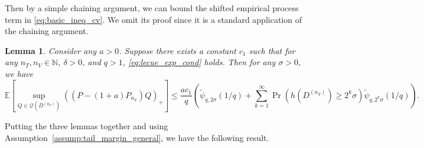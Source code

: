 \documentclass[10pt]{book}
\newtheorem{lemma}{Lemma}
\theoremstyle{definition}
\begin{document}
Then by a simple chaining argument, we can bound the shifted empirical process term in \eqref{eq:basic_ineq_cv}.
We omit its proof since it is a standard application of the chaining argument.
\begin{lemma}
	\label{lemma:chain}
Consider any $a>0$.
Suppose there exists a constant $c_{1}$ such that for any $n_{T},n_{V} \in \mathbb{N}$, $\delta>0$,
and $q>1$, \eqref{eq:lecue_exp_cond} holds.
Then for any $\sigma > 0$, we have
\[
\mathbb{E}\left[\sup_{Q\in\mathcal{Q}(D^{(n_{T})})}\left(\left({P}-(1+a)P_{n_{V}}\right)Q\right)_{+}\right]
\le
\frac{ac_1}{q}
\left(
\tilde{\psi}_{q,2\sigma}(1/q)
+\sum_{k=1}^{\infty}\Pr\left(h\left(D^{(n_{T})}\right)\ge2^{k}\sigma\right)
\tilde{\psi}_{q,2^{k}\sigma}(1/q)
\right)
.
\]
\end{lemma}
Putting the three lemmas together and using Assumption~\ref{assump:tail_margin_general}, we have the following result.
\end{document}
